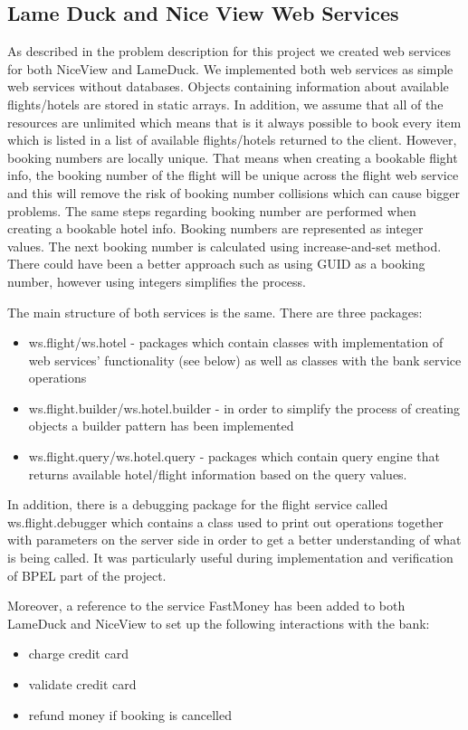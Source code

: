 \subsection{Lame Duck and Nice View Web Services}
As described in the problem description for this project we created web services for both NiceView and LameDuck. We implemented both web services as simple web services without databases. Objects containing information about available flights/hotels are stored in static arrays. In addition, we assume that all of the resources are unlimited which means that is it always possible to book every item which is listed in a list of available flights/hotels returned to the client. However, booking numbers are locally unique. That means when creating a bookable flight info, the booking number of the flight will be unique across the flight web service and this will remove the risk of booking number collisions which can cause bigger problems. The same steps regarding booking number are performed when creating a bookable hotel info. Booking numbers are represented as integer values. The next booking number is calculated using increase-and-set method. There could have been a better approach such as using GUID as a booking number, however using integers simplifies the process.

The main structure of both services is the same. There are three packages:

\begin{itemize}
\item ws.flight/ws.hotel - packages which contain classes with implementation of web services’ functionality (see below) as well as classes with the bank service operations
\item ws.flight.builder/ws.hotel.builder - in order to simplify the process of creating objects a builder pattern has been implemented
\item ws.flight.query/ws.hotel.query -  packages which contain query engine that returns available hotel/flight information based on the query values.
\end{itemize}
In addition, there is a debugging package for the flight service called ws.flight.debugger which contains a class used to print out operations together with parameters on the server side in order to get a better understanding of what is being called. It was particularly useful during implementation and verification of BPEL part of the project.

Moreover, a reference to the service FastMoney has been added to both LameDuck and NiceView to set up the following interactions with the bank: 
\begin{itemize}
\item charge credit card
\item validate credit card
\item refund money if booking is cancelled
\end{itemize}

